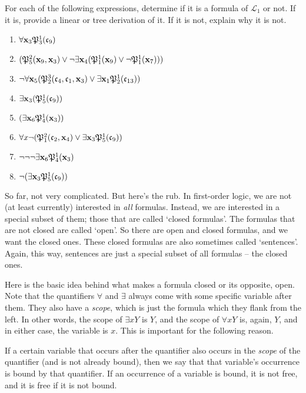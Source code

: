 \begin{exc}
	For each of the following expressions, determine if it is a formula of $\mathcal{L}_1$ or not. If it is, provide a linear or tree derivation of it. If it is not, explain why it is not. 
	
	\begin{enumerate}
	\item $\forall \mathbf{x}_{3} \mathfrak{P}^{1}_{3}(\mathfrak{c}_{9})$
	\item $(\mathfrak{P}^{2}_{5}(\mathbf{x}_{9}, \mathbf{x}_{3}) \vee \neg \exists \mathbf{x}_{4}(\mathfrak{P}^{1}_{1}(\mathbf{x}_{9}) \vee \neg \mathfrak{P}^{1}_{1}(\mathbf{x}_{7})))$
	\item $\neg \forall \mathbf{x}_{5} (\mathfrak{P}^{3}_{2}(\mathfrak{c}_{4}, \mathfrak{c}_{1}, \mathbf{x}_{3}) \vee \exists \mathbf{x}_{1} \mathfrak{P}^{1}_{2}(\mathfrak{c}_{13}))$
	\item $\exists \mathbf{x}_{3}(\mathfrak{P}^{1}_{5}(\mathfrak{c}_{9}))$
	\item $(\exists \mathbf{x}_{6} \mathfrak{P}^{1}_{4}(\mathbf{x}_{3}))$
	\item $\forall x \neg (\mathfrak{P}^{2}_{1}(\mathfrak{c}_{2}, \mathbf{x}_{4}) \vee \exists \mathbf{x}_{3}\mathfrak{P}^{1}_{5}(\mathfrak{c}_{9}))$
	\item $\neg\neg\neg\exists \mathbf{x}_{6} \mathfrak{P}^{1}_{4}(\mathbf{x}_{3})$
	\item $\neg(\exists \mathbf{x}_{3}\mathfrak{P}^{1}_{5}(\mathfrak{c}_{9}))$
	\end{enumerate}
\end{exc}

So far, not very complicated. But here's the rub. In first-order logic, we are not (at least currently) interested in \textit{all} formulas. Instead, we are interested in a special subset of them; those that are called `closed formulas'. The formulas that are not closed are called `open'. So there are open and closed formulas, and we want the closed ones. These closed formulas are also sometimes called `sentences'. Again, this way, sentences are just a special subset of all formulas -- the closed ones. 

Here is the basic idea behind what makes a formula closed or its opposite, open. Note that the quantifiers $\forall$ and $\exists$ always come with some specific variable after them. They also have a \textit{scope}, which is just the formula which they flank from the left. In other words, the scope of $\exists x Y$ is $Y$, and the scope of $\forall x Y$ is, again, $Y$, and in either case, the variable is $x$. This is important for the following reason. 

If a certain variable that occurs after the quantifier also occurs in the \textit{scope} of the quantifier (and is not already bound), then we say that that variable's occurrence is bound by that  quantifier. If an occurrence of a variable is bound, it is not free, and it is free if it is not bound. 

